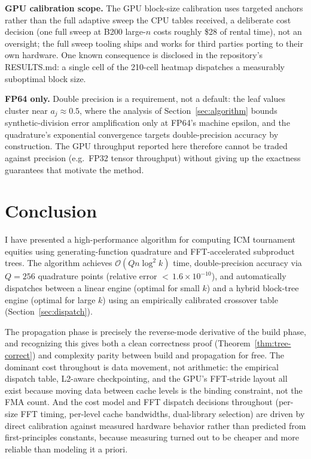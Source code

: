 \documentclass[11pt]{article}
\newcommand{\bigO}{\mathcal{O}}
\begin{document}
\textbf{GPU calibration scope.} The GPU block-size calibration uses
targeted anchors rather than the full adaptive sweep the CPU tables
received, a deliberate cost decision (one full sweep at B200 large-$n$
costs roughly \$28 of rental time), not an oversight; the full sweep
tooling ships and works for third parties porting to their own hardware.
One known consequence is disclosed in the repository's RESULTS.md: a
single cell of the 210-cell heatmap dispatches a measurably suboptimal
block size.

\textbf{FP64 only.} Double precision is a requirement, not a default: the
leaf values cluster near $a_j \approx 0.5$, where the analysis of
Section~\ref{sec:algorithm} bounds synthetic-division error amplification
only at FP64's machine epsilon, and the quadrature's exponential
convergence targets double-precision accuracy by construction. The GPU
throughput reported here therefore cannot be traded against precision
(e.g.\ FP32 tensor throughput) without giving up the exactness guarantees
that motivate the method.

\section{Conclusion}\label{sec:conclusion}

I have presented a high-performance algorithm for computing ICM tournament
equities using generating-function quadrature and FFT-accelerated
subproduct trees. The algorithm achieves $\bigO(Qn\log^2 k)$ time, double-precision accuracy via $Q = 256$ quadrature points (relative error
${<}\,1.6 \times 10^{-10}$), and automatically dispatches
between a linear engine (optimal for small $k$) and a hybrid block-tree
engine (optimal for large $k$) using an empirically calibrated crossover
table (Section~\ref{sec:dispatch}).

The propagation phase is precisely the reverse-mode derivative of the
build phase, and recognizing this gives both a clean correctness proof
(Theorem~\ref{thm:tree-correct}) and complexity parity between build and
propagation for free. The dominant cost throughout is data movement, not
arithmetic: the empirical dispatch table, L2-aware checkpointing, and the
GPU's FFT-stride layout all exist because moving data between cache levels
is the binding constraint, not the FMA count. And the cost model and FFT
dispatch decisions throughout (per-size FFT timing, per-level cache
bandwidths, dual-library selection) are driven by direct calibration
against measured hardware behavior rather than predicted from first-principles
constants, because measuring turned out to be cheaper and more reliable
than modeling it a priori.
\end{document}

